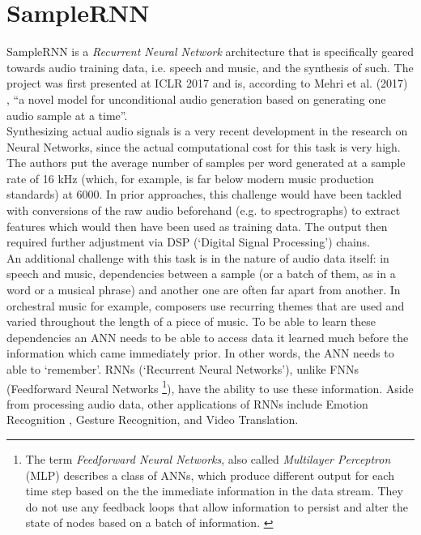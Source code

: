 \documentclass[a4paper, 11pt]{report}
\begin{document}
\chapter{SampleRNN}
SampleRNN is a \textit{Recurrent Neural Network} architecture that is specifically 
geared towards audio training data, i.e. speech and music, and the synthesis 
of such. The project was first presented at ICLR 2017 and is, according to 
Mehri et al. (2017) %
, “a novel model for unconditional audio generation 
based on generating one audio sample at a time”. \\
Synthesizing actual audio signals is a very recent development in the 
research on Neural Networks, since the actual computational cost for this 
task is very high. The authors put the average number of samples per word 
generated at a sample rate of 16 kHz (which, for example, is far below 
modern music production standards) at 6000\cite{mehri2016samplernn}. 
In prior approaches, this 
challenge would have been tackled with conversions of the raw audio 
beforehand (e.g. to spectrographs) to extract features which would then 
have been used as training data. The output then required further 
adjustment via DSP (‘Digital Signal Processing’) chains. \\
An additional challenge with this task is in the nature of audio data itself: 
in speech and music, dependencies between a sample (or a batch of them, as in 
a word or a musical phrase) and another one are often far apart from another. 
In orchestral music for example, composers use recurring themes that are 
used and varied throughout the length of a piece of music. To be able to learn 
these dependencies an ANN needs to be able to access data it learned much before 
the information which came immediately prior. In other words, the ANN needs to 
able to ‘remember’. RNNs (‘Recurrent Neural Networks’), unlike FNNs 
(Feedforward Neural Networks
\footnote{The term \textit{Feedforward Neural Networks}, 
also called \textit{Multilayer Perceptron} (MLP) describes a class of ANNs, 
which produce different output for each time step based on the the immediate 
information in the data stream. They do not use any feedback loops that allow 
information to persist and alter the state of nodes based on a batch of information.
\cite[p. 164]{goodfellow2016deep}}), 
have the ability to use these information. Aside 
from processing audio data, other applications of RNNs include Emotion Recognition
\cite{ebrahimi2015recurrent}, 
Gesture Recognition\cite[]{murakami1991gesture}, and Video Translation\cite{venugopalan2014translating}.  \\
\end{document}
